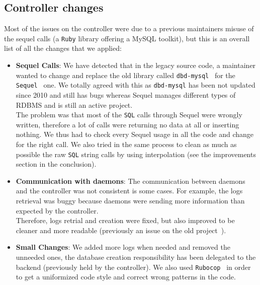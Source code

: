 \documentclass{eplmastersthesis}
\begin{document}
      \subsection{Controller changes}

        Most of the issues on the controller were due to a previous
        maintainers misuse of the sequel calls (a \texttt{Ruby} library offering a MySQL
        toolkit), but this is an overall list of all the changes that we
        applied:

        \begin{itemize}
          \item \textbf{Sequel Calls}: We have detected that in the legacy
          source code, a maintainer wanted to change and replace the old library
          called \texttt{dbd-mysql}~\cite{dbdMysql} for the \texttt{Sequel}~\cite{Sequel} one. We
          totally agreed with this as \texttt{dbd-mysql} has been not updated since
          2010 and still has bugs whereas Sequel manages different types of
          RDBMS and is still an active project.\\
          The problem was that most of the \texttt{SQL} calls through Sequel were wrongly
          written, therefore a lot of calls were returning no data at all or
          inserting nothing. We thus had to check every Sequel usage in all the
          code and change for the right call. We also tried in the same process
          to clean as much as possible the raw \texttt{SQL} string calls by using
          interpolation (see the improvements section in the conclusion).
          \item \textbf{Communication with daemons}: The communication between daemons
          and the controller was not consistent is some cases. For example, the
          logs retrieval was buggy because daemons were sending more
          information than expected by the controller.\\
          Therefore, logs retrial and creation were fixed, but
          also improved to be cleaner and more readable (previously an issue on
          the old project~\cite{logTimestamps}).
          \item \textbf{Small Changes}: We added more logs when needed and
          removed the unneeded ones, the database creation responsibility has
          been delegated to the backend (previously held by the controller). We
          also used \texttt{Rubocop}~\cite{Rubocop} in order to get a uniformized code
          style and correct wrong patterns in the code.
        \end{itemize}
\end{document}
